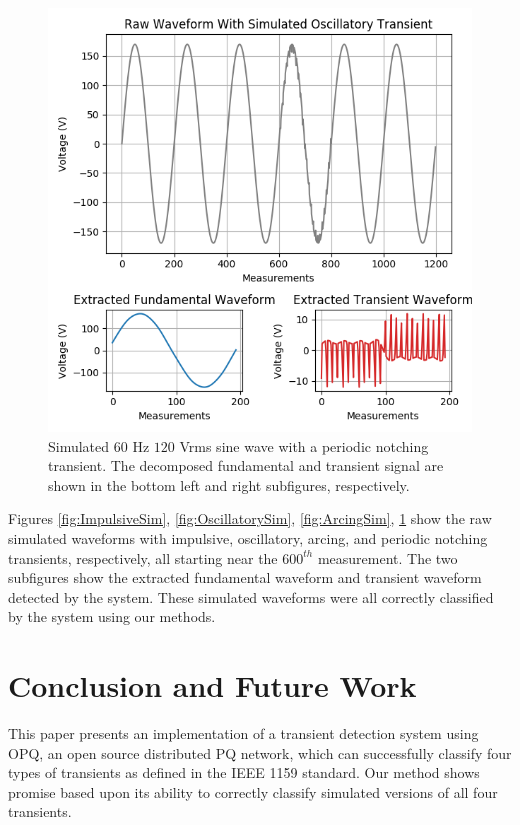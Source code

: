 \documentclass[10pt, conference, compsocconf]{IEEEtran}
\begin{document}
\begin{figure}[htbp]
\centering%
\includegraphics[scale=0.35]{./figures/notching_sim.png}
\caption{Simulated $60$ Hz $120$ Vrms sine wave with a periodic notching transient. The decomposed fundamental and transient signal are shown in the bottom left and right subfigures, respectively.}\label{fig:NotchingSim}
\end{figure}

Figures \ref{fig:ImpulsiveSim}, \ref{fig:OscillatorySim}, \ref{fig:ArcingSim}, \ref{fig:NotchingSim} show the raw simulated waveforms with impulsive, oscillatory, arcing, and periodic notching transients, respectively, all starting near the $600^{th}$ measurement. The two subfigures show the extracted fundamental waveform and transient waveform detected by the system. These simulated waveforms were all correctly classified by the system using our methods.

\section{Conclusion and Future Work}
\label{sec:Conlcusion}

This paper presents an implementation of a transient detection system using OPQ, an open source distributed PQ network, which can successfully classify four types of transients as defined in the IEEE 1159 standard. Our method shows promise based upon its ability to correctly classify simulated versions of all four transients.
\end{document}
